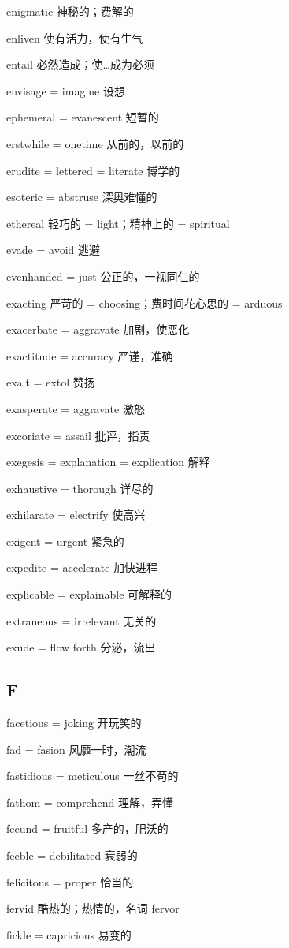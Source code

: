 \documentclass[UTF8, fontset = none, zihao = -4, linespread = 1.1]{ctexart}
\begin{document}
\begin{multicols}{2}
enigmatic 神秘的；费解的

enliven 使有活力，使有生气

entail 必然造成；使…成为必须

envisage = imagine 设想

ephemeral = evanescent 短暂的

erstwhile = onetime 从前的，以前的

erudite = lettered = literate 博学的

esoteric = abstruse 深奥难懂的

ethereal 轻巧的 = light；精神上的 = spiritual

evade = avoid 逃避

evenhanded = just 公正的，一视同仁的

exacting 严苛的 = choosing；费时间花心思的 = arduous

exacerbate = aggravate 加剧，使恶化

exactitude = accuracy 严谨，准确

exalt = extol 赞扬

exasperate = aggravate 激怒

excoriate = assail 批评，指责

exegesis = explanation = explication 解释

exhaustive = thorough 详尽的

exhilarate = electrify 使高兴

exigent = urgent 紧急的

expedite = accelerate 加快进程

explicable = explainable 可解释的

extraneous = irrelevant 无关的

exude = flow forth 分泌，流出

\subsection*{F}
facetious = joking 开玩笑的

fad = fasion 风靡一时，潮流

fastidious = meticulous 一丝不苟的

fathom = comprehend 理解，弄懂

fecund = fruitful 多产的，肥沃的

feeble = debilitated 衰弱的

felicitous = proper 恰当的

fervid 酷热的；热情的，名词 fervor

fickle = capricious 易变的


\end{multicols}
\end{document}
